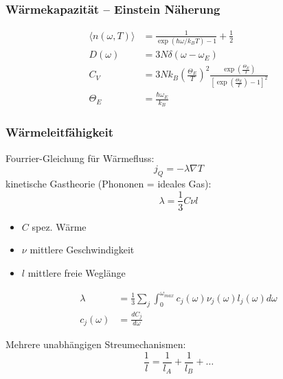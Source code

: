 \subsubsection*{Wärmekapazität – Einstein Näherung}
\begin{equation*}
    \begin{aligned}
        \langle n(\omega,T) \rangle &= \frac{1}{\exp(\hbar \omega / k_B T) -1} + \frac{1}{2}\\
        D(\omega) &= 3N \delta(\omega-\omega_E) \\
        C_V &= 3N k_B \left(\frac{\Theta_E}{T}\right)^2 \frac{\exp\left(\frac{\Theta_E}{T}\right)}{\left[\exp \left(\frac{\Theta_E}{T}\right)-1\right]^2} \\
        \Theta_E &= \frac{\hbar \omega_E}{k_B}
    \end{aligned}
\end{equation*}

\subsubsection*{Wärmeleitfähigkeit}
Fourrier-Gleichung für Wärmefluss:
\begin{equation*}
    j_Q = - \lambda \nabla T
\end{equation*}
kinetische Gastheorie (Phononen = ideales Gas):
\begin{equation*}
    \lambda = \frac{1}{3} C \nu l
\end{equation*}

\begin{itemize}
    \itemsep 0pt
    \item $C$ spez. Wärme
    \item $\nu$ mittlere Geschwindigkeit 
    \item $l$ mittlere freie Weglänge
\end{itemize}

\begin{equation*}
    \begin{aligned}
        \lambda &= \frac{1}{3} \sum_j \int_0^{\omega_{max}} c_j(\omega) \nu_j(\omega) l_j(\omega) d\omega \\
        c_j(\omega) &= \frac{dC_j}{d\omega}
    \end{aligned}
\end{equation*}

Mehrere unabhängigen Streumechanismen:
\begin{equation*}
    \frac{1}{l} = \frac{1}{l_A} + \frac{1}{l_B} + \dots
\end{equation*}

